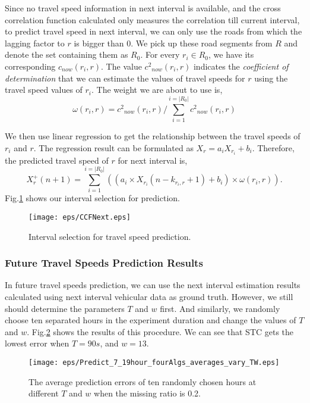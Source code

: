\documentclass[twocolumn,10pt,final,conference]{IEEEtran}
\begin{document}
Since no travel speed information in next interval is available, and the cross correlation function calculated only measures the correlation till current interval, to predict travel speed in next interval, we can only use the roads from which the lagging factor to $r$ is bigger than $0$. We pick up these road segments from $R$ and denote  the set containing them as $R_0$. For every $r_i\in R_0$, we have its corresponding $c_{now}(r_i,r)$. The value ${{c^2}_{now}(r_i,r)}$ indicates the \emph{coefficient of determination} that we can estimate the values of travel speeds for $r$ using the travel speed values of $r_i$. The weight we are about to use is,
\[
\omega(r_i,r)={c^2}_{now}(r_i,r)/\sum_{i=1}^{i=|R_0|}{{c^2}_{now}(r_i,r)}
\]

We then use linear regression to get the relationship between the travel speeds of $r_i$ and $r$. The regression result can be formulated as $X_{r}=a_{i}X_{r_i}+b_i$.
Therefore, the predicted travel speed of $r$ for next interval is,
\begin{equation}\label{equ-predict TS}
X_{r}^{+}(n+1)=\sum_{i=1}^{i=|R_0|}((a_i \times X_{r_i}(n-k_{r_i,r}+1)+b_i)\times \omega(r_i,r)).
\end{equation}
Fig.\ref{fig-illustration of Next} shows our interval selection for prediction.

\begin{figure}[!h]
  \centering
\texttt{[image: eps/CCFNext.eps]}\\
  \caption{Interval selection for travel speed prediction.}
  \label{fig-illustration of Next}
\end{figure}

\subsubsection{Future Travel Speeds Prediction Results}\label{section-expe-future}
\quad

In future travel speeds prediction, we can use the next interval estimation results calculated using next interval vehicular data as ground truth. However, we still should determine the parameters $T$ and $w$ first. And similarly, we randomly choose ten separated hours in the experiment duration and change the values of $T$ and $w$. Fig.\ref{fig-predict-difft-w-STC} shows the results of this procedure. We can see that STC gets the lowest error when $T=90s$, and $w=13$.

\begin{figure}[h]
  \centering
\texttt{[image: eps/Predict\_7\_19hour\_fourAlgs\_averages\_vary\_TW.eps]}\\
  \caption{The average prediction errors of ten randomly chosen hours at different $T$ and $w$ when the missing ratio is 0.2.}
  \label{fig-predict-difft-w-STC}
\end{figure}
\end{document}
